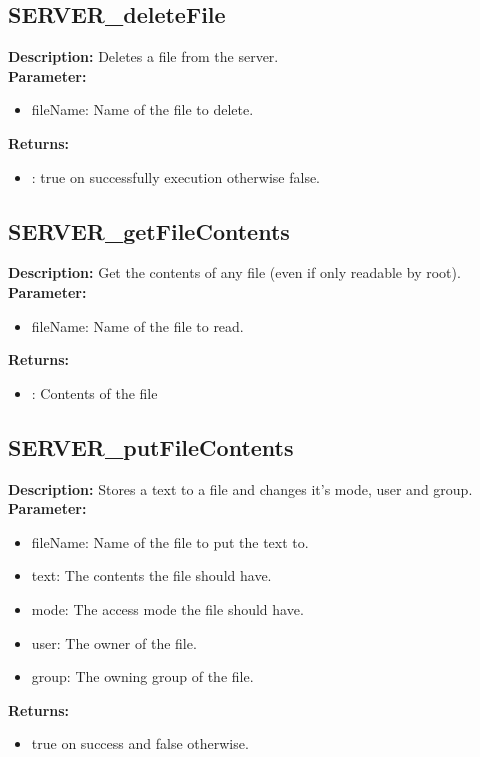 \subsection{SERVER\_deleteFile}
\textbf{Description:} Deletes a file from the server.\\
\textbf{Parameter:}
\begin{itemize}
\item fileName: Name of the file to delete.
\end{itemize}
\textbf{Returns:}
\begin{itemize}
\item : true on successfully execution otherwise false.
\end{itemize}

\subsection{SERVER\_getFileContents}
\textbf{Description:} Get the contents of any file (even if only readable by root).\\
\textbf{Parameter:}
\begin{itemize}
\item fileName: Name of the file to read.
\end{itemize}
\textbf{Returns:}
\begin{itemize}
\item : Contents of the file
\end{itemize}

\subsection{SERVER\_putFileContents}
\textbf{Description:} Stores a text to a file and changes it's mode, user and group.\\
\textbf{Parameter:}
\begin{itemize}
\item fileName: Name of the file to put the text to.
\item text: The contents the file should have.
\item mode: The access mode the file should have.
\item user: The owner of the file.
\item group: The owning group of the file.
\end{itemize}
\textbf{Returns:}
\begin{itemize}
\item true on success and false otherwise.
\end{itemize}

